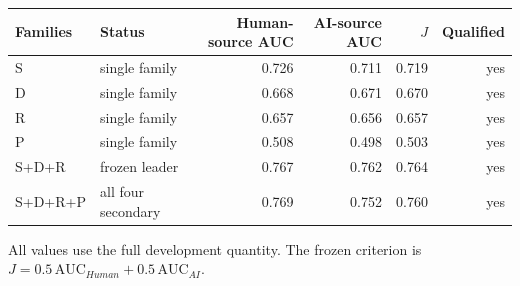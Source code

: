 \begin{tabular}{llrrrr}
\toprule
Families & Status & Human-source AUC & AI-source AUC & $J$ & Qualified \\
\midrule
S & single family & 0.726 & 0.711 & 0.719 & yes \\
D & single family & 0.668 & 0.671 & 0.670 & yes \\
R & single family & 0.657 & 0.656 & 0.657 & yes \\
P & single family & 0.508 & 0.498 & 0.503 & yes \\
S+D+R & frozen leader & 0.767 & 0.762 & 0.764 & yes \\
S+D+R+P & all four secondary & 0.769 & 0.752 & 0.760 & yes \\
\bottomrule
\end{tabular}
\par\smallskip
{\footnotesize All values use the full development quantity. The frozen criterion is $J=0.5\,\mathrm{AUC}_{Human}+0.5\,\mathrm{AUC}_{AI}$.}
